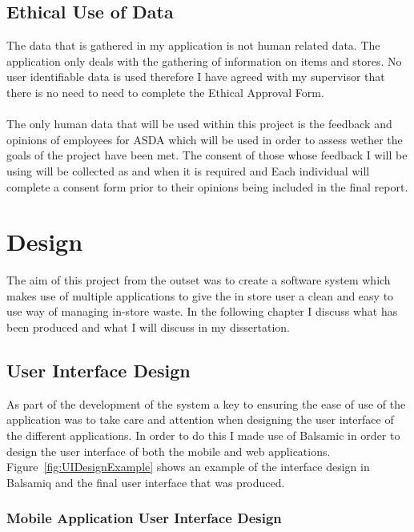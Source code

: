 \documentclass[a4paper,11pt]{report}
\begin{document}
   
\section{Ethical Use of Data}
The data that is gathered in my application is not human related data.
The application only deals with the gathering of information on items and stores.
No user identifiable data is used therefore I have agreed with my supervisor that
there is no need to need to complete the Ethical Approval Form.
\\
\\
The only human data that will be used within this project is the feedback and opinions
of employees for ASDA which will be used in order to assess wether the goals of the 
project have been met. The consent of those whose feedback I will be using will be 
collected as and when it is required and Each individual will complete a consent form
prior to their opinions being included in the final report.


\chapter{Design}
The aim of this project from the outset was to create a software system which makes use of multiple applications
 to give the in store user a clean and easy to use way of managing in-store waste. In the following chapter I 
 discuss what has been produced and what I will discuss in my dissertation.

\section{User Interface Design}

As part of the development of the system a key to ensuring the ease of use of the application was to take care and attention when
designing the user interface of the different applications. In order to do this I made use of Balsamic\cite{balsamiq} in order to design the user
interface of both the mobile and web applications. Figure~\ref{fig:UIDesignExample} shows an example of the 
interface design in Balsamiq and the final user interface that was produced. 

\subsection{Mobile Application User Interface Design}
\end{document}
